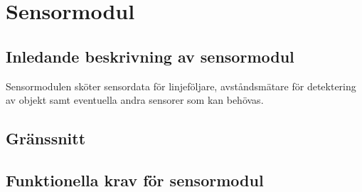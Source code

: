 \section{Sensormodul}
\subsection{Inledande beskrivning av sensormodul}
Sensormodulen sköter sensordata för linjeföljare, avståndsmätare för detektering av objekt samt eventuella andra sensorer som kan behövas. 

\subsection{Gränssnitt}
\begin{LIPSkravlista}
\end{LIPSkravlista}

\subsection{Funktionella krav för sensormodul}
\begin{LIPSkravlista}
\end{LIPSkravlista}
